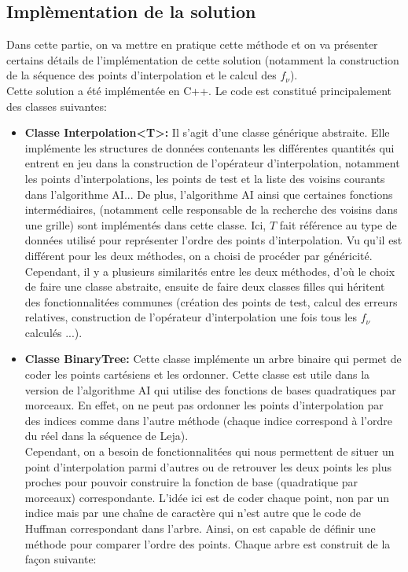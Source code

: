 \subsection{Implèmentation de la solution}\label{sec:5}
Dans cette partie, on va mettre en pratique cette méthode et on va présenter certains détails de l'implémentation de cette solution (notamment la construction de la séquence des points d'interpolation et le calcul des $f_{\nu}$).\\
Cette solution a été implémentée en C++. Le code est constitué principalement des classes suivantes:
\begin{itemize}
\item \textbf{Classe Interpolation<T>:} Il s'agit d'une classe générique abstraite. Elle implémente les structures de données contenants les différentes quantités qui entrent en jeu dans la construction de l'opérateur d'interpolation, notamment les points d'interpolations, les points de test et la liste des voisins courants dans l'algorithme AI... De plus, l'algorithme AI ainsi que certaines fonctions intermédiaires, (notamment celle responsable de la recherche des voisins dans une grille) sont implémentés dans cette classe. Ici, $T$ fait référence au type de données utilisé pour représenter l'ordre des points d'interpolation. Vu qu'il est différent pour les deux méthodes, on a choisi de procéder par généricité.\\
Cependant, il y a plusieurs similarités entre les deux méthodes, d'où le choix de faire une classe abstraite, ensuite de faire deux classes filles qui héritent des fonctionnalitées communes (création des points de test, calcul des erreurs relatives, construction de l'opérateur d'interpolation une fois tous les $f_{\nu}$ calculés ...).
\item \textbf{Classe BinaryTree:} Cette classe implémente un arbre binaire qui permet de coder les points cartésiens et les ordonner. Cette classe est utile dans la version de l'algorithme AI qui utilise des fonctions de bases quadratiques par morceaux. En effet, on ne peut pas ordonner les points d'interpolation par des indices comme dans l'autre méthode (chaque indice correspond à l'ordre du réel dans la séquence de Leja).\\
Cependant, on a besoin de fonctionnalitées qui nous permettent de situer un point d'interpolation parmi d'autres ou de retrouver les deux points les plus proches pour pouvoir construire la fonction de base (quadratique par morceaux) correspondante. L'idée ici est de coder chaque point, non par un indice mais par une chaîne de caractère qui n'est autre que le code de Huffman correspondant dans l'arbre. Ainsi, on est capable de définir une méthode pour comparer l'ordre des points. Chaque arbre est construit de la façon suivante:

\end{itemize}
